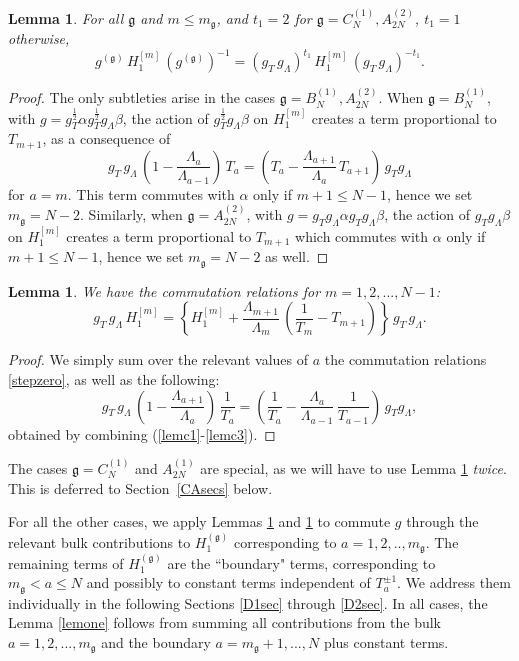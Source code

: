 \documentclass[12pt]{amsart}
\newtheorem{lemma}[thm]{Lemma}
\newcommand{\g}{{\mathfrak{g}}}
\newcommand{\al}{{\alpha}}
\newcommand{\lL}{{\Lambda}}
\numberwithin{equation}{section}
\begin{document}
\begin{lemma}\label{lembulk}
For all $\g$ and $m\leq m_\g$, and $t_1=2$ for $\g=C_N^{(1)},A_{2N}^{(2)}$, $t_1=1$ otherwise,
$$
g^{(\g)}\, H_1^{[m]} \, (g^{(\g)})^{-1} =(g_T\,g_\lL)^{t_1} \, H_1^{[m]} \, (g_T\,g_\lL)^{-t_1} .
%
%
$$
\end{lemma}
\begin{proof}
The only subtleties arise in the cases $\g=B_N^{(1)},A_{2N}^{(2)}$. When $\g=B_N^{(1)}$, with $g=g_T^{\frac{1}{2}} \al g_T^{\frac{1}{2}} g_\lL \beta$, the action of $g_T^{\frac{1}{2}} g_\lL \beta$ on $H_1^{[m]}$ creates a term proportional to $T_{m+1}$,
as a consequence of 
\begin{equation}\label{stepzero}
g_T\, g_\lL\, \left(1-\frac{\lL_a}{\lL_{a-1}}\right)\, T_a =\left(T_a-\frac{\lL_{a+1}}{\lL_a}\,T_{a+1}\right)\, g_Tg_\lL
\end{equation}
for $a=m$.
This term commutes with $\al$ only if $m+1\leq N-1$, hence we set $m_\g=N-2$. 
Similarly, when $\g=A_{2N}^{(2)}$, with $g=g_Tg_\lL \al g_Tg_\lL\beta$, the action of 
$g_Tg_\lL\beta$ on $H_1^{[m]}$ creates a term proportional to $T_{m+1}$ which commutes with $\al$ only if $m+1\leq N-1$, hence we set $m_\g=N-2$ as well. 
\end{proof}
%
\begin{lemma}\label{bulklem}
We have the commutation relations for $m=1,2,...,N-1$:
$$g_T\,g_\lL \, H_1^{[m]} =\left\{H_1^{[m]} +\frac{\lL_{m+1}}{\lL_m}\,\left(\frac{1}{T_m}- T_{m+1}\right)\right\}\, g_T \,g_\lL .$$
\end{lemma}
\begin{proof}
We simply sum over the relevant values of $a$ the commutation relations \eqref{stepzero}, as well as the following:
\begin{equation}\label{comtinv} g_T\, g_\lL\, \left(1-\frac{\lL_{a+1}}{\lL_{a}}\right)\, \frac{1}{T_a} =\left( \frac{1}{T_a}-\frac{\lL_{a}}{\lL_{a-1}}\, \frac{1}{T_{a-1}}\right)\, g_Tg_\lL ,
\end{equation}
obtained by combining (\ref{lemc1}-\ref{lemc3}).
\end{proof}

The cases $\g=C_N^{(1)}$ and $A_{2N}^{(1)}$ are special, as we will have to use Lemma \ref{bulklem} {\it twice}. This is deferred to Section~\ref{CAsecs} below.

For all the other cases, we apply Lemmas \ref{lembulk} and \ref{bulklem} to commute $g$ through the relevant bulk contributions to $H_1^{(\g)}$ corresponding to $a=1,2,..,m_\g$. The remaining terms of $H_1^{(\g)}$ are the ``boundary" terms, corresponding to $m_\g<a\leq N$ and possibly to constant terms independent of $T_a^{\pm1}$. We address them individually in the following Sections \ref{D1sec} through \ref{D2sec}. In all cases, the Lemma \ref{lemone} follows from summing all contributions
from the bulk $a=1,2,...,m_\g$ and the boundary $a=m_\g+1,...,N$ plus constant terms.
\end{document}
